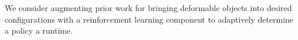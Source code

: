 We consider augmenting prior work for bringing deformable objects into
desired configurations with a reinforcement learning component to
adaptively determine a policy a runtime.
